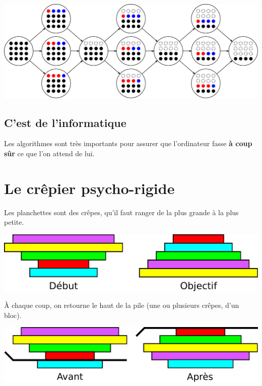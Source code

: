 \documentclass[a7paper,pagesize,DIV=14,10pt]{scrbook}
\begin{document}
\includegraphics[width=\linewidth]{img/nim16.pdf}

\subsection*{C'est de l'informatique}
\vspace{-.5\baselineskip} %
Les algorithmes sont très importants pour assurer que l'ordinateur
fasse \textbf{à coup sûr} ce que l'on attend de lui.

\newpage
\section*{Le crêpier psycho-rigide}

\vspace{-.5\baselineskip}
Les planchettes sont des crêpes, qu'il faut ranger de la plus grande à
la plus petite.

\smallskip
\includegraphics[width=\linewidth]{img/crepes_but-du-jeu.pdf}

À chaque coup, on retourne le haut de la pile (une ou plusieurs crêpes,
d'un bloc).

\smallskip
\includegraphics[width=\linewidth]{img/crepes_un-coup.pdf}
\end{document}
